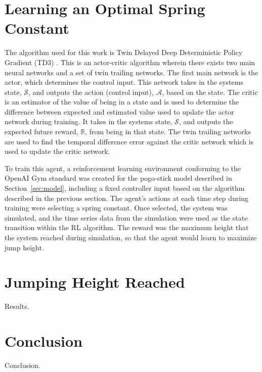 \documentclass[twocolumn,10pt]{asme2e}
\begin{document}
\section{Learning an Optimal Spring Constant}
\label{sec:learning_spring}
%
The algorithm used for this work is Twin Delayed Deep Deterministic Policy Gradient (TD3) \cite{Fujimoto2018d}. This is an actor-critic algorithm wherein there exists two main neural networks and a set of twin trailing networks. The first main network is the actor, which determines the control input. This network takes in the systems state, $\mathcal{S}$, and outputs the action (control input), $\mathcal{A}$, based on the state. The critic is an estimator of the value of being in a state and is used to determine the difference between expected and estimated value used to update the actor network during training. It takes in the systems state, $\mathcal{S}$, and outputs the expected future reward, $\mathbb{R}$, from being in that state. The twin trailing networks are used to find the temporal difference error against the critic network which is used to update the critic network. 

To train this agent, a reinforcement learning environment conforming to the OpenAI Gym standard \cite{Brockman2016c} was created for the pogo-stick model described in Section~\ref{sec:model}, including a fixed controller input based on the algorithm described in the previous section. The agent's actions at each time step during training were selecting a spring constant. Once selected, the system was simulated, and the time series data from the simulation were used as the state transition within the RL algorithm. The reward was the maximum height that the system reached during simulation, so that the agent would learn to maximize jump height.

\section{Jumping Height Reached} 
\label{sec:results}
Results.

\section{Conclusion}
\label{sec:conclusion}
Conclusion.
\end{document}
